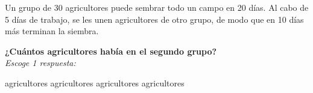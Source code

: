 \question[25] Un grupo de 30 agricultores puede sembrar todo un campo en 20 días. Al cabo de 5 días de trabajo,
se les unen agricultores de otro grupo, de modo que en 10 días
más terminan la siembra.

\textbf{¿Cuántos agricultores había en el segundo grupo?}\\
\emph{Escoge 1 respuesta:}

\begin{choices}
     agricultores
     agricultores
     agricultores
     agricultores
\end{choices}
